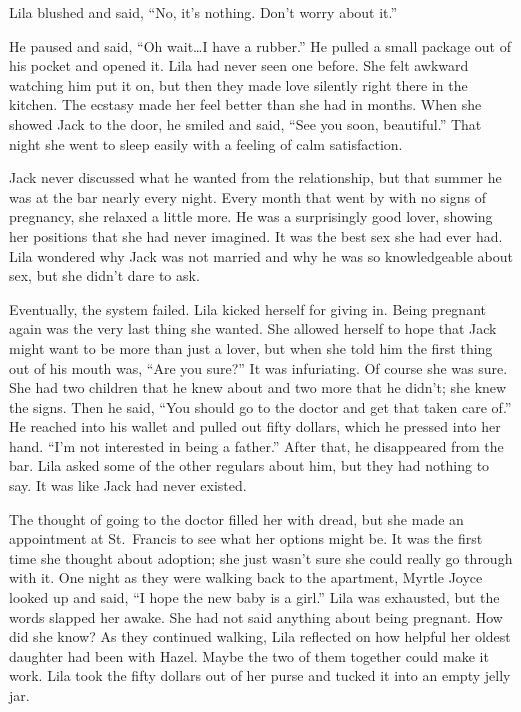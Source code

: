 \documentclass[
  letterpaper,
]{book}
\begin{document}
Lila blushed and said, ``No, it's nothing. Don't worry about it.''

He paused and said, ``Oh wait\ldots I have a rubber.'' He pulled a small
package out of his pocket and opened it. Lila had never seen one before.
She felt awkward watching him put it on, but then they made love
silently right there in the kitchen. The ecstasy made her feel better
than she had in months. When she showed Jack to the door, he smiled and
said, ``See you soon, beautiful.'' That night she went to sleep easily
with a feeling of calm satisfaction.

Jack never discussed what he wanted from the relationship, but that
summer he was at the bar nearly every night. Every month that went by
with no signs of pregnancy, she relaxed a little more. He was a
surprisingly good lover, showing her positions that she had never
imagined. It was the best sex she had ever had. Lila wondered why Jack
was not married and why he was so knowledgeable about sex, but she
didn't dare to ask.

Eventually, the system failed. Lila kicked herself for giving in. Being
pregnant again was the very last thing she wanted. She allowed herself
to hope that Jack might want to be more than just a lover, but when she
told him the first thing out of his mouth was, ``Are you sure?'' It was
infuriating. Of course she was sure. She had two children that he knew
about and two more that he didn't; she knew the signs. Then he said,
``You should go to the doctor and get that taken care of.'' He reached
into his wallet and pulled out fifty dollars, which he pressed into her
hand. ``I'm not interested in being a father.'' After that, he
disappeared from the bar. Lila asked some of the other regulars about
him, but they had nothing to say. It was like Jack had never existed.

The thought of going to the doctor filled her with dread, but she made
an appointment at St.~Francis to see what her options might be. It was
the first time she thought about adoption; she just wasn't sure she
could really go through with it. One night as they were walking back to
the apartment, Myrtle Joyce looked up and said, ``I hope the new baby is
a girl.'' Lila was exhausted, but the words slapped her awake. She had
not said anything about being pregnant. How did she know? As they
continued walking, Lila reflected on how helpful her oldest daughter had
been with Hazel. Maybe the two of them together could make it work. Lila
took the fifty dollars out of her purse and tucked it into an empty
jelly jar.
\end{document}
